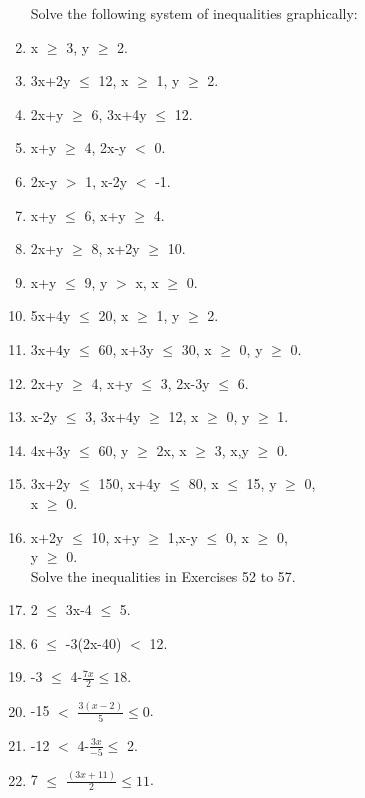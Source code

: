 \begin{enumerate}[label=\arabic*.,ref=\thesubsection.\theenumi]
Solve the following system of inequalities graphically:
    \item x $\geq$ 3, y $\geq$ 2.\\
    \item 3x+2y $\leq$ 12, x $\geq$ 1, y $\geq$ 2.\\
    \item 2x+y $\geq$ 6, 3x+4y $\leq$ 12.\\
    \item x+y $\geq$ 4, 2x-y $<$ 0.\\
    \item 2x-y $>$ 1, x-2y $<$ -1.\\
    \item x+y $\leq$ 6, x+y $\geq$ 4.\\
    \item 2x+y $\geq$ 8, x+2y $\geq$ 10.\\
    \item x+y $\leq$ 9, y $>$ x, x $\geq$ 0.\\
    \item 5x+4y $\leq$ 20, x $\geq$ 1, y $\geq$ 2.\\
    \item 3x+4y $\leq$ 60, x+3y $\leq$ 30, x $\geq$ 0, y $\geq$ 0.\\
    \item 2x+y $\geq$ 4, x+y $\leq$ 3, 2x-3y $\leq$ 6.\\
    \item x-2y $\leq$ 3, 3x+4y $\geq$ 12, x $\geq$ 0, y $\geq$ 1.\\
    \item 4x+3y $\leq$ 60, y $\geq$ 2x, x $\geq$ 3, x,y $\geq$ 0.\\
    \item 3x+2y $\leq$ 150, x+4y $\leq$ 80, x $\leq$ 15, y $\geq$ 0,\\
    x $\geq$ 0. \\    
    \item x+2y $\leq$ 10, x+y $\geq$ 1,x-y $\leq$ 0, x $\geq$ 0, \\
    y $\geq$ 0.\\
    
 Solve the inequalities in Exercises 52 to 57.\\
 
    \item 2 $\leq$ 3x-4 $\leq$ 5.\\
    \item 6 $\leq$ -3(2x-40)  $<$ 12.\\
    \item -3 $\leq$ 4-$\frac{7x}{2} \leq 18$.\\ 
    \item -15 $<$ $\frac{3(x-2)}{5} \leq 0$.\\
    \item -12 $<$ 4-$\frac{3x}{-5} \leq$ 2.\\
    \item 7 $\leq$ $\frac{(3x+11)}{2} \leq 11$.\\
    

\end{enumerate}
